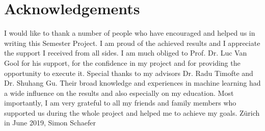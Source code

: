 \newpage
\chapter*{Acknowledgements}

I would like to thank a number of people who have encouraged and helped us in writing this Semester Project. I am proud of the achieved results and I
appreciate the support I received from all sides.
\vspace{0.5cm}
\newline
I am much obliged to Prof. Dr. Luc Van Gool for his support, for the confidence in my project and for providing the opportunity to execute it.
\vspace{0.5cm}
\newline
Special thanks to my advisors Dr. Radu Timofte and Dr. Shuhang Gu. Their broad knowledge and experiences in machine learning had a wide influence on the results and also especially on my education.
\vspace{0.5cm}
\newline
Most importantly, I am very grateful to all my friends and family members
who supported us during the whole project and helped me to achieve my goals.
\vspace{0.5cm}
\newline
Zürich in June 2019,
\newline
Simon Schaefer
